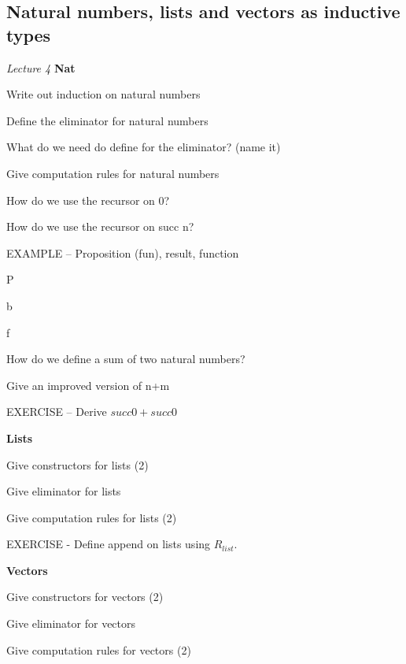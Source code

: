 \documentclass[fleqn]{article}
\begin{document}
\subsection{Natural numbers, lists and vectors as inductive types}
\textit{Lecture 4}
\textbf{Nat}
\begin{enumerate}
    {\color{green}\item Write out induction on natural numbers}
    {\color{red}\item Define the eliminator for natural numbers}
    {\color{red}\item What do we need do define for the eliminator? (name it)}
    \item Give computation rules for natural numbers
    \begin{itemize}
        {\color{red}\item How do we use the recursor on 0?}
        {\color{blue}\item How do we use the recursor on succ n?   } 
    \end{itemize}
    {\color{blue}\item EXAMPLE -- Proposition (fun), result, function}
    \begin{itemize}
        {\color{green}\item P}
        {\color{green}\item b}
        {\color{green}\item f}
    \end{itemize}
    {\color{green}\item How do we define a sum of two natural numbers?}
    {\color{green}\item Give an improved version of n+m}
    \item EXERCISE -- Derive $succ 0 + succ 0$
\end{enumerate}

\textbf{Lists}
\begin{enumerate}
    {\color{red}\item Give constructors for lists (2)}
    {\color{blue}\item Give eliminator for lists}
    {\color{red}\item Give computation rules for lists (2)}
    \item EXERCISE - Define append on lists using $R_{list}$.
\end{enumerate}

\textbf{Vectors}
\begin{enumerate}
    {\color{red}\item Give constructors for vectors (2)}
    {\color{green}\item Give eliminator for vectors}
    {\color{red}\item Give computation rules for vectors (2)}
\end{enumerate}
\end{document}
